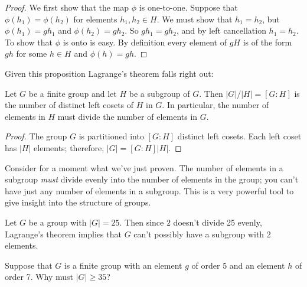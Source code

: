 \begin{proof}
We first show that the map $\phi$ is one-to-one.  Suppose that $\phi(h_1)  = \phi(h_2)$ for elements $h_1, h_2 \in H$.  We must show that $h_1 =  h_2$, but $\phi(h_1) = gh_1$ and $\phi(h_2) = gh_2$.  So $gh_1 = gh_2$,  and by left cancellation $h_1= h_2$.  To show that $\phi$ is onto is easy.  By definition every element of $gH$ is of the form $gh$ for some $h \in H$ and $\phi(h) = gh$. 
\end{proof}
Given this proposition Lagrange's theorem falls right out:

\begin{thm}\label{LagrangeTheorem}
Let $G$ be a finite group and let $H$ be a subgroup of $G$.  Then $|G|/|H| = [G : H]$ is the number of distinct left cosets of $H$ in $G$.  In particular, the number of elements in $H$ must divide the number of elements in $G$. 
\end{thm}

\begin{proof}
The group $G$ is partitioned into $[G : H]$ distinct left cosets.  Each left coset has $|H|$ elements; therefore, $|G| = [G : H] |H|$.
\end{proof}

Consider for a moment what we've just proven. The number of elements in a subgroup \emph{must} divide evenly into the number of elements in the group; you can't have just any number of elements in a subgroup. This is a very powerful tool to give insight into the structure of groups.

\begin{example}{}
Let $G$ be a group with $|G|=25$.  Then since $2$ doesn't divide 25 evenly, Lagrange's theorem implies that $G$ can't possibly have a subgroup with 2 elements.
\end{example}

\begin{exercise}{}
Suppose that $G$ is a finite group with an element $g$ of order 5 and an element $h$ of order 7. Why must $|G| \geq 35$?
\end{exercise} 

